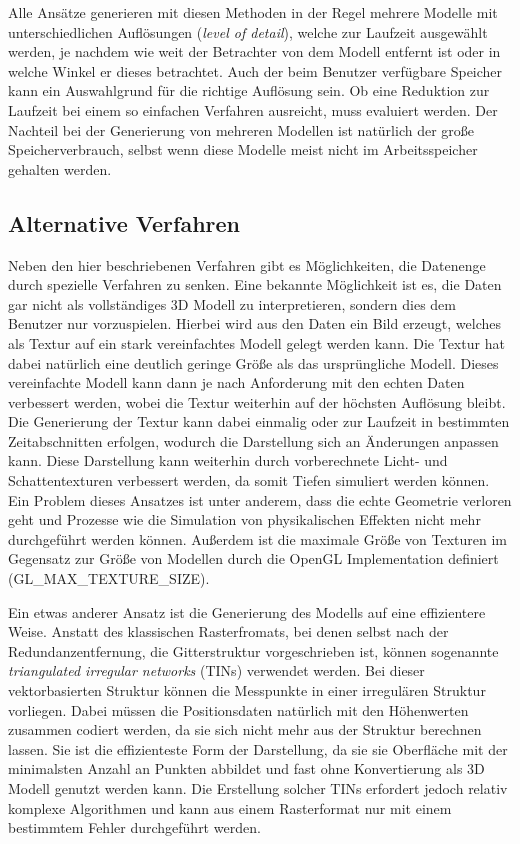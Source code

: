 Alle Ansätze generieren mit diesen Methoden in der Regel mehrere Modelle mit unterschiedlichen Auflösungen (\textit{level of detail}), welche zur Laufzeit ausgewählt werden, je nachdem wie weit der Betrachter von dem Modell entfernt ist oder in welche Winkel er dieses betrachtet. Auch der beim Benutzer verfügbare Speicher kann ein Auswahlgrund für die richtige Auflösung sein. Ob eine Reduktion zur Laufzeit bei einem so einfachen Verfahren ausreicht, muss evaluiert werden. Der Nachteil bei der Generierung von mehreren Modellen ist natürlich der große Speicherverbrauch, selbst wenn diese Modelle meist nicht im Arbeitsspeicher gehalten werden.

\subsection{Alternative Verfahren}
Neben den hier beschriebenen Verfahren gibt es Möglichkeiten, die Datenenge durch spezielle Verfahren zu senken. Eine bekannte Möglichkeit ist es, die Daten gar nicht als vollständiges 3D Modell zu interpretieren, sondern dies dem Benutzer nur vorzuspielen. Hierbei wird aus den Daten ein Bild erzeugt, welches als Textur auf ein stark vereinfachtes Modell gelegt werden kann\cite[Abschnitt 5.1]{outOfCore}. Die Textur hat dabei natürlich eine deutlich geringe Größe als das ursprüngliche Modell. Dieses vereinfachte Modell kann dann je nach Anforderung mit den echten Daten verbessert werden, wobei die Textur weiterhin auf der höchsten Auflösung bleibt. Die Generierung der Textur kann dabei einmalig oder zur Laufzeit in bestimmten Zeitabschnitten erfolgen, wodurch die Darstellung sich an Änderungen anpassen kann. Diese Darstellung kann weiterhin durch vorberechnete Licht- und Schattentexturen verbessert werden, da somit Tiefen simuliert werden können. Ein Problem dieses Ansatzes ist unter anderem, dass die echte Geometrie verloren geht und Prozesse wie die Simulation von physikalischen Effekten nicht mehr durchgeführt werden können. Außerdem ist die maximale Größe von Texturen im Gegensatz zur Größe von Modellen durch die OpenGL Implementation definiert (GL\_MAX\_TEXTURE\_SIZE).

Ein etwas anderer Ansatz ist die Generierung des Modells auf eine effizientere Weise. Anstatt des klassischen Rasterfromats, bei denen selbst nach der Redundanzentfernung, die Gitterstruktur vorgeschrieben ist, können sogenannte \textit{triangulated irregular networks} (TINs) verwendet werden. Bei dieser vektorbasierten Struktur können die Messpunkte in einer irregulären Struktur vorliegen. Dabei müssen die Positionsdaten natürlich mit den Höhenwerten zusammen codiert werden, da sie sich nicht mehr aus der Struktur berechnen lassen. Sie ist die effizienteste Form der Darstellung, da sie sie Oberfläche mit der minimalsten Anzahl an Punkten abbildet und fast ohne Konvertierung als 3D Modell genutzt werden kann. Die Erstellung solcher TINs erfordert jedoch relativ komplexe Algorithmen und kann aus einem Rasterformat nur mit einem bestimmtem Fehler durchgeführt werden\cite{tinAlgo}.

